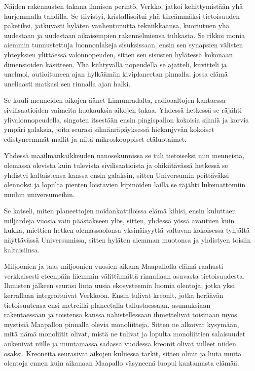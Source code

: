 Näiden rakennusten takana ihmisen perintö, Verkko, jatkoi kehittymistään yhä hurjemmalla tahdilla. Se tiivistyi, kristallisoitui yhä tiheämmäksi tietoisuuden paketiksi, jatkuvasti hyläten vanhentunutta tekniikkaansa, kuoriutuen yhä uudestaan ja uudestaan aikaisempien rakennelmiensa tuhkasta. Se rikkoi monia aiemmin tunnustettuja luonnonlakeja sisuksissaan, ensin sen synapsien välisten yhteyksien ylittäessä valonnopeuden, sitten sen sisusten hylätessä kokonaan dimensioiden käsitteen. Yhä kiihtyvällä nopeudella se ajatteli, kuvitteli ja unelmoi, autioituneen ajan hylkäämän kiviplaneetan pinnalla, jossa elämä uneliaasti matkasi sen rinnalla ajan halki.


Se kuuli menneiden aikojen äänet Linnunradalta, radioaaltojen kantaessa sivilisaatioiden vaimeita huokauksia aikojen takaa. Yhdessä hetkessä se räjähti ylivalonnopeudella, singoten itsestään ensin pingispallon kokoisia silmiä ja korvia ympäri galaksia, joita seurasi silmänräpäyksessä hiekanjyvän kokoiset edistyneemmät mallit ja niitä mikroskooppiset etäluotaimet.


Yhdessä maailmankaikkeuden nanosekunnissa se tuli tietoiseksi niin menneistä, olemassa olevista kuin tulevista sivilisaatioista ja ohikiitävässä hetkessä se yhdistyi kaltaistensa kanssa ensin galaksin, sitten Universumin peittäväksi olennoksi ja lopulta pienten loistavien kipinöiden lailla se räjähti lukemattomiin muihin universumeihin.


Se katseli, miten planeettojen noidankattiloissa elämä kihisi, ensin kuluttaen miljardeja vuosia vain päästäkseen ylös, sitten, yhdessä yössä avautuen kuin kukka, miettien hetken olemassaolonsa yksinäisyyttä valtavan kokoisessa tyhjältä näyttävässä Universumissa, sitten hyläten aiemman muotonsa ja yhdistyen toisiin kaltaisiinsa.


Miljoonien ja taas miljoonien vuosien aikana Maapallolla elämä raahusti verkkaisesti eteenpäin liiemmin välittämättä rinnallaan asuvasta tietoisuudesta. Ihmisten jälkeen seurasi liuta uusia ekosysteemin luomia olentoja, jotka yksi kerrallaan integroituivat Verkkoon. Ensin tulivat kreonit, jotka heräävän tietoisuutensa ensi metreillä planeetalla tallustaessaan, asumuksiaan rakentaessaan ja toistensa kanssa nahistellessaan ihmettelivät toisinaan myös mystisiä Maapallon pinnalla olevia monoliitteja. Sitten ne alkoivat kysymään, mitä nämä monoliitit olivat, mistä ne tulivat ja lopulta monoliittien salaisuudet aukenivat niille ja muutamassa sadassa vuodessa kreonit olivat tulleet niiden osaksi. Kreoneita seurasivat aikojen kuluessa tarkit, sitten olmit ja liuta muita olentoja ennen kuin aikanaan Maapallo väsyneenä luopui kantamasta elämää.


